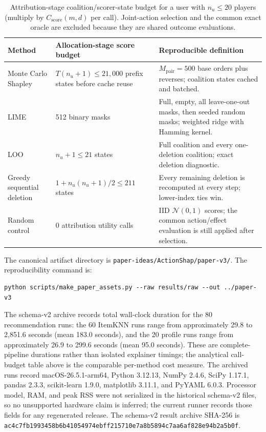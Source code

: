 \documentclass[pdflatex,sn-mathphys-num]{sn-jnl}
\theoremstyle{thmstyleone}
\theoremstyle{thmstyletwo}
\theoremstyle{thmstylethree}
\begin{document}
\begin{table}[t]
\centering\small
\caption{Attribution-stage coalition/scorer-state budget for a user with $n_u\le20$ players (multiply by $C_{\mathrm{score}}(m,d)$ per call). Joint-action selection and the common exact oracle are excluded because they are shared outcome evaluations.}
\label{tab:computational-cost}
\begin{tabular}{@{}p{}p{}p{}@{}}
\toprule
Method & Allocation-stage score budget & Reproducible definition \\
\midrule
Monte Carlo Shapley & $T(n_u+1)\le21{,}000$ prefix states before cache reuse & $M_{\mathrm{pair}}=500$ base orders plus reverses; coalition states cached and batched. \\
LIME & 512 binary masks & Full, empty, all leave-one-out masks, then seeded random masks; weighted ridge with Hamming kernel. \\
LOO & $n_u+1\le21$ states & Full coalition and every one-deletion coalition; exact deletion diagnostic. \\
Greedy sequential deletion & $1+n_u(n_u+1)/2\le211$ states & Every remaining deletion is recomputed at every step; lower-index ties win. \\
Random control & 0 attribution utility calls & IID $\mathcal{N}(0,1)$ scores; the common action/effect evaluation is still applied after selection. \\
\bottomrule
\end{tabular}
\end{table}

The canonical artifact directory is \texttt{paper-ideas/ActionShap/paper-v3/}. The reproducibility command is:
\begin{verbatim}
python scripts/make_paper_assets.py --raw results/raw --out ../paper-v3
\end{verbatim}
The schema-v2 archive records total wall-clock duration for the 80 recommendation runs: the 60 ItemKNN runs range from approximately 29.8 to 2,851.6 seconds (mean 183.0 seconds), and the 20 profile runs range from approximately 26.9 to 299.6 seconds (mean 95.0 seconds). These are complete-pipeline durations rather than isolated explainer timings; the analytical call-budget table above is the comparable per-method cost measure. The archived runs record macOS-26.5.1-arm64, Python 3.12.13, NumPy 2.4.6, SciPy 1.17.1, pandas 2.3.3, scikit-learn 1.9.0, matplotlib 3.11.1, and PyYAML 6.0.3. Processor model, RAM, and peak RSS were not serialized in the historical schema-v2 files, so no unsupported hardware claim is inferred; the current runner records those fields for any regenerated release. The schema-v2 result archive SHA-256 is \texttt{ac4c7fb1993458b6b41054974ebff215710e7a8b5894c7aa6af828e94b2a5b0f}.
\end{document}
